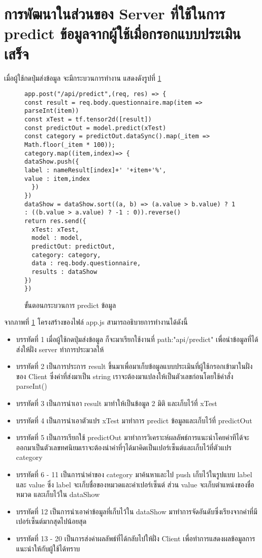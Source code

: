 \section{การพัฒนาในส่วนของ Server ที่ใช้ในการ predict ข้อมูลจากผู้ใช้เมื่อกรอกแบบประเมินเสร็จ}
เมื่อผู้ใช้กดปุ่มส่งข้อมูล จะมีกระบวนการทำงาน แสดงดังรูปที่ \ref{Fig:4-predict}
\begin{figure}[H]
{\begin{lstlisting}
app.post("/api/predict",(req, res) => {
const result = req.body.questionnaire.map(item => parseInt(item)) 
const xTest = tf.tensor2d([result])
const predictOut = model.predict(xTest)
const category = predictOut.dataSync().map(_item => Math.floor(_item * 100));
category.map((item,index)=> {
dataShow.push({
label : nameResult[index]+' '+item+'%',
value : item,index
  })
})
dataShow = dataShow.sort((a, b) => (a.value > b.value) ? 1 : ((b.value > a.value) ? -1 : 0)).reverse()
return res.send({
  xTest: xTest,
  model : model,
  predictOut: predictOut,
  category: category,
  data : req.body.questionnaire,
  results : dataShow
})
})
\end{lstlisting}}
\caption{ขั้นตอนกระบวนการ predict ข้อมูล}
\label{Fig:4-predict}
\end{figure}
\newpage
จากภาพที่ \ref{Fig:4-predict} โครงสร้างของไฟล์ app.js สามารถอธิบายการทำงานได้ดังนี้
\begin{itemize}[label={--}]
\item บรรทัดที่ 1 เมื่อผู้ใช้กดปุ่มส่งข้อมูล ก็จะมาเรียกใช้งานที่ path:"api/predict" เพื่อนำข้อมูลที่ได้ส่งให้ฝั่ง server ทำการประมวลให้
\item บรรทัดที่ 2 เป็นการประการ result ขึ้นมาเพื่อมาเก็บข้อมูลแบบประเมินที่ผู้ใช้กรอกเข้ามาในฝั่งของ Client ซึ่งค่าที่ส่งมาเป็น string เราจะต้องมาแปลงให้เป็นตัวเลขก่อนโดยใช้คำสั่ง parseInt()
\item บรรทัดที่ 3 เป็นการนำเอา result มาทำให้เป็นข้อมูล 2 มิติ และเก็บไว้ที่ xTest
\item บรรทัดที่ 4 เป็นการนำเอาตัวแปร xTest มาทำการ predict ข้อมูลและเก็บไว้ที่ predictOut
\item บรรทัดที่ 5 เป็นการเรียกใช้ predictOut มาทำการวิเคราะห์ผลลัพธ์การแนะนำโคยค่าทีได้จะออกมาเป็นตัวเลขทศนิยมเราจะต้องนำค่าที่ๆได้มาคิดเป็นเปอร์เซ็นต์และเก็บไว้ที่ตัวแปร category
\item บรรทัดที่ 6 - 11 เป็นการนำค่าของ category มาค้นหาและไป push เก็บไว้ในรูปแบบ label และ value ซึ่ง label จะเก็บชื่อของหมวดและค่าเปอร์เซ็นต์ ส่วน value จะเก็บตำแหน่งของชื่อหมวด และเก็บไว้ใน dataShow
\item บรรทัดที่ 12 เป็นการนำเอาค่าข้อมูลที่เก็บไว้ใน dataShow มาทำการจัดอันดับซึ่งเรียงจากค่าที่มีเปอร์เซ็นต์มากสุดไปน้อยสุด
\item บรรทัดที่ 13 - 20 เป็นการส่งค่าผลลัพธ์ที่ได้กลับไปให้ฝั่ง Client เพื่อทำการแสดงผลข้อมูลการแนะนำให้กับผู้ใช้ได้ทราบ
\end{itemize}
\newpage